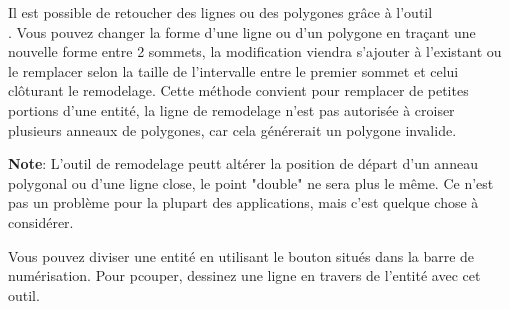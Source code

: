 
Il est possible de retoucher des lignes ou des polygones grâce à l'outil\\ . Vous pouvez changer la forme d'une ligne ou d'un polygone en traçant une nouvelle forme entre 2 sommets, la modification viendra s'ajouter à l'existant ou le remplacer selon la taille de l'intervalle entre le premier sommet et celui clôturant le remodelage. Cette méthode convient pour remplacer de petites portions d'une entité, la ligne de remodelage n'est pas autorisée à croiser plusieurs anneaux de polygones, car cela générerait un polygone invalide.

\textbf{Note}: L'outil de remodelage peutt altérer la position de départ d'un anneau polygonal ou d'une ligne close, le point "double" ne sera plus le même. Ce n'est pas un problème pour la plupart des applications, mais c'est quelque chose à considérer.


Vous pouvez diviser une entité en utilisant le bouton  situés dans la barre de numérisation. Pour pcouper, dessinez une ligne en travers de l'entité avec cet outil.


